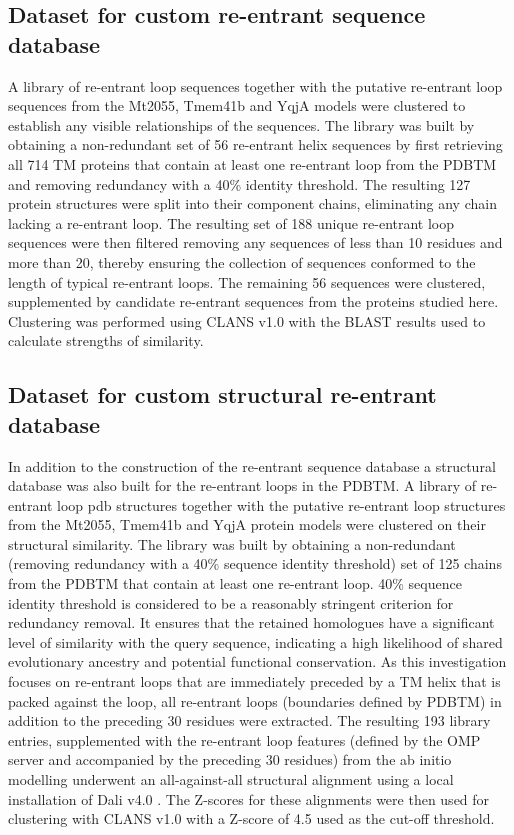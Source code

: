 \subsection{Dataset for custom re-entrant sequence database}
A library of re-entrant loop sequences together with the putative re-entrant loop sequences from the Mt2055, Tmem41b and YqjA models were clustered to establish any visible relationships of the sequences. The library was built by obtaining a non-redundant set of 56 re-entrant helix sequences by first retrieving all 714 TM proteins that contain at least one re-entrant loop from the PDBTM \cite{Kozma2012} and removing redundancy with a 40\% identity threshold. The resulting 127 protein structures were split into their component chains, eliminating any chain lacking a re-entrant loop. The resulting set of 188 unique re-entrant loop sequences were then filtered removing any sequences of less than 10 residues and more than 20, thereby ensuring the collection of sequences conformed to the length of typical \cite{Yan2010} re-entrant loops. The remaining 56 sequences were clustered, supplemented by candidate re-entrant sequences from the proteins studied here. Clustering was performed using CLANS v1.0 \cite{Frickey2004} with the BLAST \cite{Altschul1997} results used to calculate strengths of similarity.

\subsection{Dataset for custom structural re-entrant database}
In addition to the construction of the re-entrant sequence database a structural database was also built for the re-entrant loops in the PDBTM. A library of re-entrant loop pdb structures together with the putative re-entrant loop structures from the Mt2055, Tmem41b and YqjA protein models were clustered on their structural similarity. The library was built by obtaining a non-redundant (removing redundancy with a 40\% sequence identity threshold) set of 125 chains from the PDBTM \cite{Kozma2012} that contain at least one re-entrant loop. 40\% sequence identity threshold is considered to be a reasonably stringent criterion for redundancy removal. It ensures that the retained homologues have a significant level of similarity with the query sequence, indicating a high likelihood of shared evolutionary ancestry and potential functional conservation. As this investigation focuses on re-entrant loops that are immediately preceded by a TM helix that is packed against the loop, all re-entrant loops (boundaries defined by PDBTM) in addition to the preceding 30 residues were extracted. The resulting 193 library entries, supplemented with the re-entrant loop features (defined by the OMP server \cite{Lomize2012} and accompanied by the preceding 30 residues) from the ab initio modelling underwent an all-against-all structural alignment using a local installation of Dali v4.0 \cite{Holm2016}. The Z-scores for these alignments were then used for clustering with CLANS v1.0 \cite{Frickey2004} with a Z-score of 4.5 used as the cut-off threshold.

